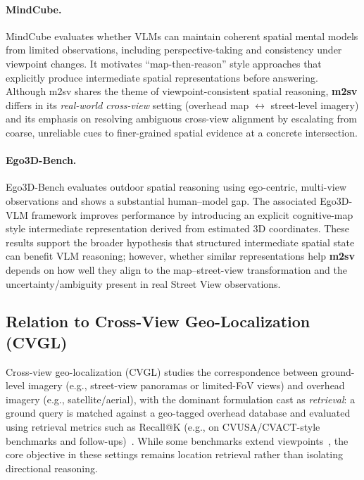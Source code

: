\paragraph{MindCube.}
MindCube \citep{yin2025spatialmental} evaluates whether VLMs can maintain coherent spatial mental
models from limited observations, including perspective-taking and consistency
under viewpoint changes. It motivates ``map-then-reason'' style approaches that
explicitly produce intermediate spatial representations before answering.
Although m2sv shares the theme of viewpoint-consistent spatial reasoning,
\textbf{m2sv} differs in its \emph{real-world cross-view} setting (overhead map
$\leftrightarrow$ street-level imagery) and its emphasis on resolving ambiguous cross-view alignment by escalating
from coarse, unreliable cues to finer-grained spatial evidence at a concrete
intersection.

\paragraph{Ego3D-Bench.}
Ego3D-Bench \citep{ego3dbench2025} evaluates outdoor spatial reasoning using ego-centric,
multi-view observations and shows a substantial human--model gap. The associated
Ego3D-VLM framework improves performance by introducing an explicit
cognitive-map style intermediate representation derived from estimated 3D
coordinates. These results support the broader hypothesis that structured
intermediate spatial state can benefit VLM reasoning; however, whether similar
representations help \textbf{m2sv} depends on how well they align to the
map--street-view transformation and the uncertainty/ambiguity present in real
Street View observations.

\subsection{Relation to Cross-View Geo-Localization (CVGL)}
\label{sec:background-cvgl}

Cross-view geo-localization (CVGL) studies the correspondence between ground-level imagery
(e.g., street-view panoramas or limited-FoV views) and overhead imagery (e.g., satellite/aerial),
with the dominant formulation cast as \emph{retrieval}: a ground query is matched against a
geo-tagged overhead database and evaluated using retrieval metrics such as Recall@K
(e.g., on CVUSA/CVACT-style benchmarks and follow-ups)~\cite{workman2015cvusa,liu2019lending,zhu2021vigor,huang2024cvcities}.
While some benchmarks extend viewpoints~\cite{zheng2020university1652},
the core objective in these settings remains location retrieval rather than isolating directional reasoning.

